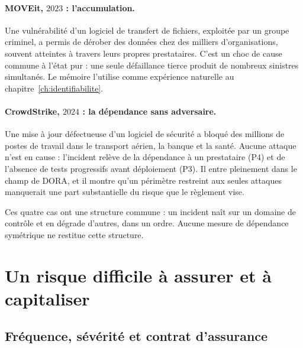\paragraph{MOVEit, $2023$ : l'accumulation.} Une vulnérabilité d'un logiciel de transfert de
fichiers, exploitée par un groupe criminel, a permis de dérober des données chez des milliers
d'organisations, souvent atteintes à travers leurs propres prestataires. C'est un choc de cause
commune à l'état pur : une seule défaillance tierce produit de nombreux sinistres simultanés. Le
mémoire l'utilise comme expérience naturelle au chapitre~\ref{ch:identifiabilite}.

\paragraph{CrowdStrike, $2024$ : la dépendance sans adversaire.} Une mise à jour défectueuse d'un
logiciel de sécurité a bloqué des millions de postes de travail dans le transport aérien, la
banque et la santé. Aucune attaque n'est en cause : l'incident relève de la dépendance à un
prestataire (P4) et de l'absence de tests progressifs avant déploiement (P3). Il entre pleinement
dans le champ de DORA, et il montre qu'un périmètre restreint aux seules attaques manquerait une
part substantielle du risque que le règlement vise.

\medskip
\noindent Ces quatre cas ont une structure commune : un incident naît sur un domaine de contrôle
et en dégrade d'autres, dans un ordre. Aucune mesure de dépendance symétrique ne restitue cette
structure.


\section{Un risque difficile à assurer et à capitaliser}

\subsection{Fréquence, sévérité et contrat d'assurance}

